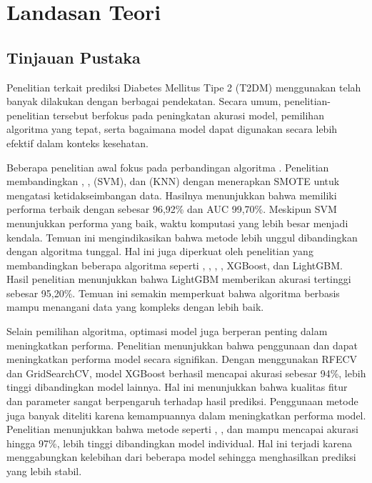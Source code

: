 \chapter{Landasan Teori}

\section{Tinjauan Pustaka}
Penelitian terkait prediksi Diabetes Mellitus Tipe 2 (T2DM) menggunakan  telah banyak dilakukan dengan berbagai pendekatan. Secara umum, penelitian-penelitian tersebut berfokus pada peningkatan akurasi model, pemilihan algoritma yang tepat, serta bagaimana model dapat digunakan secara lebih efektif dalam konteks kesehatan.

Beberapa penelitian awal fokus pada perbandingan algoritma . Penelitian \cite{ref10} membandingkan , ,  (SVM), dan  (KNN) dengan menerapkan SMOTE untuk mengatasi ketidakseimbangan data. Hasilnya menunjukkan bahwa  memiliki performa terbaik dengan  sebesar 96,92\% dan AUC 99,70\%. Meskipun SVM menunjukkan performa yang baik, waktu komputasi yang lebih besar menjadi kendala. Temuan ini mengindikasikan bahwa metode  lebih unggul dibandingkan dengan algoritma tunggal. Hal ini juga diperkuat oleh penelitian \cite{ref14} yang membandingkan beberapa algoritma seperti , , , , XGBoost, dan LightGBM. Hasil penelitian menunjukkan bahwa LightGBM memberikan akurasi tertinggi sebesar 95,20\%. Temuan ini semakin memperkuat bahwa algoritma berbasis  mampu menangani data yang kompleks dengan lebih baik.

Selain pemilihan algoritma, optimasi model juga berperan penting dalam meningkatkan performa. Penelitian \cite{ref22} menunjukkan bahwa penggunaan  dan  dapat meningkatkan performa model secara signifikan. Dengan menggunakan RFECV dan GridSearchCV, model XGBoost berhasil mencapai akurasi sebesar 94\%, lebih tinggi dibandingkan model lainnya. Hal ini menunjukkan bahwa kualitas fitur dan parameter sangat berpengaruh terhadap hasil prediksi. Penggunaan metode  juga banyak diteliti karena kemampuannya dalam meningkatkan performa model. Penelitian \cite{ref26} menunjukkan bahwa metode  seperti , , dan  mampu mencapai akurasi hingga 97\%, lebih tinggi dibandingkan model individual. Hal ini terjadi karena  menggabungkan kelebihan dari beberapa model sehingga menghasilkan prediksi yang lebih stabil.

